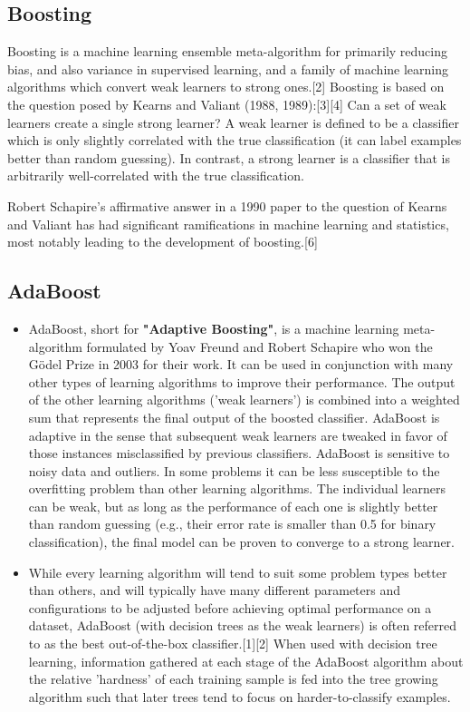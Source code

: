 \documentclass[a4paper,12pt]{article}
\begin{document}
\subsection{Boosting}

Boosting is a machine learning ensemble meta-algorithm for primarily reducing bias, and also variance in supervised learning, and a family of machine learning algorithms which convert weak learners to strong ones.[2] Boosting is based on the question posed by Kearns and Valiant (1988, 1989):[3][4] Can a set of weak learners create a single strong learner? A weak learner is defined to be a classifier which is only slightly correlated with the true classification (it can label examples better than random guessing). In contrast, a strong learner is a classifier that is arbitrarily well-correlated with the true classification.

Robert Schapire's affirmative answer in a 1990 paper to the question of Kearns and Valiant has had significant ramifications in machine learning and statistics, most notably leading to the development of boosting.[6]


\subsection{AdaBoost}
\begin{itemize}
\item AdaBoost, short for \textbf{"Adaptive Boosting"}, is a machine learning meta-algorithm formulated by Yoav Freund and Robert Schapire who won the Gödel Prize in 2003 for their work. It can be used in conjunction with many other types of learning algorithms to improve their performance. The output of the other learning algorithms ('weak learners') is combined into a weighted sum that represents the final output of the boosted classifier. AdaBoost is adaptive in the sense that subsequent weak learners are tweaked in favor of those instances misclassified by previous classifiers. AdaBoost is sensitive to noisy data and outliers. In some problems it can be less susceptible to the overfitting problem than other learning algorithms. The individual learners can be weak, but as long as the performance of each one is slightly better than random guessing (e.g., their error rate is smaller than 0.5 for binary classification), the final model can be proven to converge to a strong learner.
\item 
While every learning algorithm will tend to suit some problem types better than others, and will typically have many different parameters and configurations to be adjusted before achieving optimal performance on a dataset, AdaBoost (with decision trees as the weak learners) is often referred to as the best out-of-the-box classifier.[1][2] When used with decision tree learning, information gathered at each stage of the AdaBoost algorithm about the relative 'hardness' of each training sample is fed into the tree growing algorithm such that later trees tend to focus on harder-to-classify examples.
\end{itemize}
\end{document}
